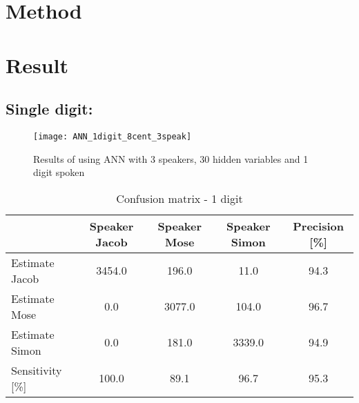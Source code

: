 \section{Method}



\section{Result}


\subsection{Single digit:}
\begin{figure}[H]
\centering
\texttt{[image: ANN\_1digit\_8cent\_3speak]}
\caption{Results of using ANN with 3 speakers, 30 hidden variables and 1 digit spoken}
\label{fig:ANN_fig_1}
\end{figure}

\begin{table}[H]                                                    
\centering                                                          
\begin{tabular}{|l|c|c|c|c|}                                        
\hline                                                              
  & Speaker Jacob & Speaker Mose & Speaker Simon & Precision [\%] \\
\hline                                                              
Estimate Jacob & 3454.0 & 196.0 & 11.0 & 94.3 \\                    
\hline                                                              
Estimate Mose & 0.0 & 3077.0 & 104.0 & 96.7 \\                      
\hline                                                              
Estimate Simon & 0.0 & 181.0 & 3339.0 & 94.9 \\                     
\hline                                                              
Sensitivity [\%] & 100.0 & 89.1 & 96.7 & 95.3 \\                    
\hline                                                              
\end{tabular}                                                       
\caption{Confusion matrix - 1 digit}                                
\label{table:ANN_conf_1}                                            
\end{table}  



